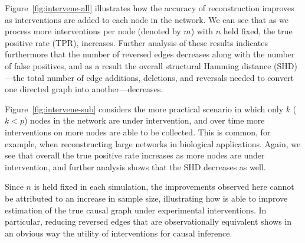 \documentclass[article]{jss}
\renewcommand{\|}{\,|\,}
\begin{document}
Figure~\ref{fig:intervene-all} illustrates how the accuracy of reconstruction improves as interventions are added to each node in the network. We can see that as we process more interventions per node (denoted by $m$) with $n$ held fixed, the true positive rate (TPR), increases. Further analysis of these results indicates furthermore that the number of reversed edges decreases along with the number of false positives, and as a result the overall structural Hamming distance (SHD)---the total number of edge additions, deletions, and reversals needed to convert one directed graph into another---decreases. 

Figure~\ref{fig:intervene-sub} considers the more practical scenario in which only $k$ ($k<p$) nodes in the network are under intervention, and over time more interventions on more nodes are able to be collected. This is common, for example, when reconstructing large networks in biological applications. Again, we see that overall the true positive rate increases as more nodes are under intervention, and further analysis shows that the SHD decreases as well.

Since $n$ is held fixed in each simulation, the improvements observed here cannot be attributed to an increase in sample size, illustrating how  is able to improve estimation of the true causal graph under experimental interventions. In particular, reducing reversed edges that are observationally equivalent shows in an obvious way the utility of interventions for causal inference.
\end{document}

